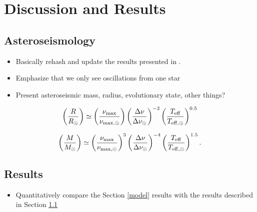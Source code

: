 \section{Discussion and Results}\label{discuss}

\subsection{Asteroseismology}\label{seismo}
\begin{itemize}
\item Basically rehash and update the results presented in \citet{gau14}.
\item Emphasize that we only see oscillations from one star
\item Present asteroseismic mass, radius, evolutionary state, other things?
\end{itemize}

\begin{equation}
\left( \frac{R}{R_\odot} \right) \simeq \left( \frac{\nu_{\rm{max}}}{\nu_{\rm{max,\odot}}} \right) \left( \frac{\Delta \nu}{\Delta \nu_\odot} \right)^{-2} \left( \frac{T_{\rm{eff}}}{T_{\rm{eff,\odot}}} \right)^{0.5}
\end{equation}

\begin{equation}
\left( \frac{M}{M_\odot} \right) \simeq \left( \frac{\nu_{\rm{max}}}{\nu_{\rm{max,\odot}}} \right)^3 \left( \frac{\Delta \nu}{\Delta \nu_\odot} \right)^{-4} \left( \frac{T_{\rm{eff}}}{T_{\rm{eff,\odot}}} \right)^{1.5}.
\end{equation}


%

\subsection{Results}\label{results}
\begin{itemize}
\item Quantitatively compare the Section \ref{model} results with the \citet{gau14} results described in Section \ref{seismo}
\end{itemize}

%
